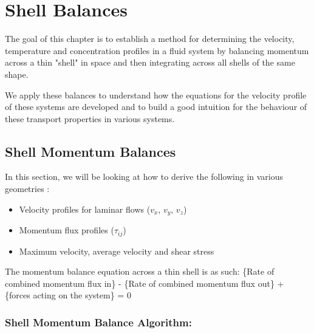 \chapter{Shell Balances}

The goal of this chapter is to establish a method for determining the velocity, temperature and concentration profiles in a fluid system by balancing momentum across a thin "shell" in space and then integrating across all shells of the same shape.

We apply these balances to understand how the equations for the velocity profile of these systems are developed and to build a good intuition for the behaviour of these transport properties in various systems.

\section{Shell Momentum Balances}

In this section, we will be looking at how to derive the following in various geometries :

\begin{itemize}

    \item Velocity profiles for laminar flows ($v_{x}$, $v_{y}$, $v_{z}$)

    \item Momentum flux profiles ($\tau_{ij}$)

    \item Maximum velocity, average velocity and shear stress

\end{itemize}


The momentum balance equation across a thin shell is as such: \{Rate of combined momentum flux in\} - \{Rate of combined momentum flux out\} + \{forces acting on the system\} = 0


\subsection{Shell Momentum Balance Algorithm:}

